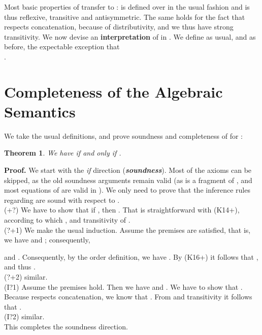 \documentclass{eptcs}
\newtheorem{thm}[defn]{Theorem}
\newcommand{\proofbeg}{\textbf{Proof. }}
\begin{document}
Most basic properties of  transfer to : 
is defined over  in the usual fashion and is thus reflexive,
transitive and antisymmetric. 
The same holds for the fact that  
respects concatenation, because of distributivity, and we thus have
strong transitivity. 
We now devise an \textbf{interpretation} of  in . 
We define  as usual, and  as before, the expectable
exception that
\\

.
\\



\section{Completeness of the Algebraic Semantics}

We take the usual definitions, and prove soundness and completeness
of  for :

\begin{thm}
We have   if and only if
.
\end{thm}

\proofbeg
We start with the \textit{if} direction (\textbf{\textit{soundness}}). 
Most of the axioms can be skipped, as the old soundness arguments
remain valid (as  is a fragment of
, and most equations of  are valid in ). 
We only need to prove that the inference rules regarding
 are sound with respect to .
\\

(+?) 
We have to show that if , 
then .
That is straightforward with (K14+),  according to which ,
and transitivity of .
\\

(?+1) 
We make the usual induction. Assume the premises
are satisfied, that is, we have
 and
; consequently,
 
and . 
Consequently, by the order definition,
we have .  
By (K16+) it follows that 
,
and thus
.
\\

(?+2) 
similar.
\\

(I?1) 
Assume the premises hold. Then we have 
 and 
. We have to show that
 . 
Because  respects concatenation, we know that
. 
From  and transitivity it follows that
.
\\

(I?2) 
similar.
\\

This completes the soundness direction. 
\\
\end{document}
